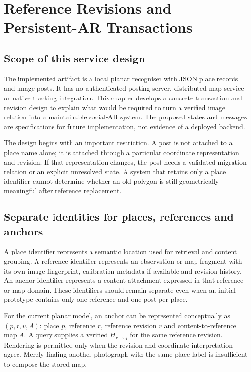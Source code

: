 \chapter{Reference Revisions and Persistent-AR Transactions}\label{ch:persistent-transactions}
\section{Scope of this service design}
\designnote
The implemented artifact is a local planar recogniser with JSON place records and image posts. It has no authenticated posting server, distributed map service or native tracking integration. This chapter develops a concrete transaction and revision design to explain what would be required to turn a verified image relation into a maintainable social-AR system. The proposed states and messages are specifications for future implementation, not evidence of a deployed backend.

The design begins with an important restriction. A post is not attached to a place name alone; it is attached through a particular coordinate representation and revision. If that representation changes, the post needs a validated migration relation or an explicit unresolved state. A system that retains only a place identifier cannot determine whether an old polygon is still geometrically meaningful after reference replacement.

\section{Separate identities for places, references and anchors}
A place identifier represents a semantic location used for retrieval and content grouping. A reference identifier represents an observation or map fragment with its own image fingerprint, calibration metadata if available and revision history. An anchor identifier represents a content attachment expressed in that reference or map domain. These identifiers should remain separate even when an initial prototype contains only one reference and one post per place.

For the current planar model, an anchor can be represented conceptually as $(p,r,v,A)$: place $p$, reference $r$, reference revision $v$ and content-to-reference map $A$. A query supplies a verified $H_{r\rightarrow q}$ for the same reference revision. Rendering is permitted only when the revision and coordinate interpretation agree. Merely finding another photograph with the same place label is insufficient to compose the stored map.


